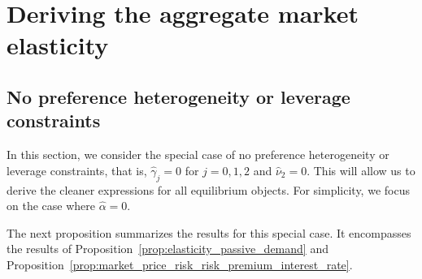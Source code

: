 \section{Deriving the aggregate market elasticity}

\subsection{No preference heterogeneity or leverage constraints}

In this section, we consider the special case of no preference heterogeneity or leverage constraints, that is, $\hat{\gamma}_j=0$ for $j=0,1,2$ and $\hat{\nu}_2=0$.
This will allow us to derive the cleaner expressions for all equilibrium objects.
For simplicity, we focus on the case where $\hat{\alpha}=0$.

The next proposition summarizes the results for this special case.
It encompasses the results of Proposition~\ref{prop:elasticity_passive_demand} and Proposition~\ref{prop:market_price_risk_risk_premium_interest_rate}.

